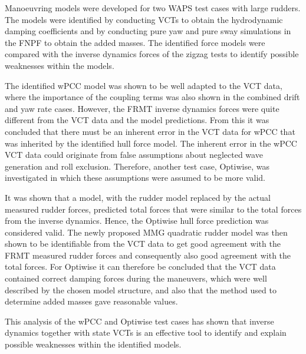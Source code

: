 %
\noindent Manoeuvring models were developed for two WAPS test cases with large rudders. The models were identified by conducting VCTs to obtain the hydrodynamic damping coefficients and by conducting pure yaw and pure sway simulations in the FNPF to obtain the added masses. The identified force models were compared with the inverse dynamics forces of the zigzag tests to identify possible weaknesses within the models.  

The identified wPCC model was shown to be well adapted to the VCT data, where the importance of the coupling terms was also shown in the combined drift and yaw rate cases.
However, the FRMT inverse dynamics forces were quite different from the VCT data and the model predictions. From this it was concluded that there must be an inherent error in the VCT data for wPCC that was inherited by the identified hull force model.
The inherent error in the wPCC VCT data could originate from false assumptions about neglected wave generation and roll exclusion. Therefore, another test case, Optiwise, was investigated in which these assumptions were assumed to be more valid.

It was shown that a model, with the rudder model replaced by the actual measured rudder forces, predicted total forces that were similar to the total forces from the inverse dynamics. Hence, the Optiwise hull force prediction was considered valid.
The newly proposed MMG quadratic rudder model was then shown to be identifiable from the VCT data to get good agreement with the FRMT measured rudder forces and consequently also good agreement with the total forces. 
For Optiwise it can therefore be concluded that the VCT data contained correct damping forces during the maneuvers, which were well described by the chosen model structure, and also that the method used to determine added masses gave reasonable values. 

This analysis of the wPCC and Optiwise test cases has shown that inverse dynamics together with state VCTs is an effective tool to identify and explain possible weaknesses within the identified models.
%
%

